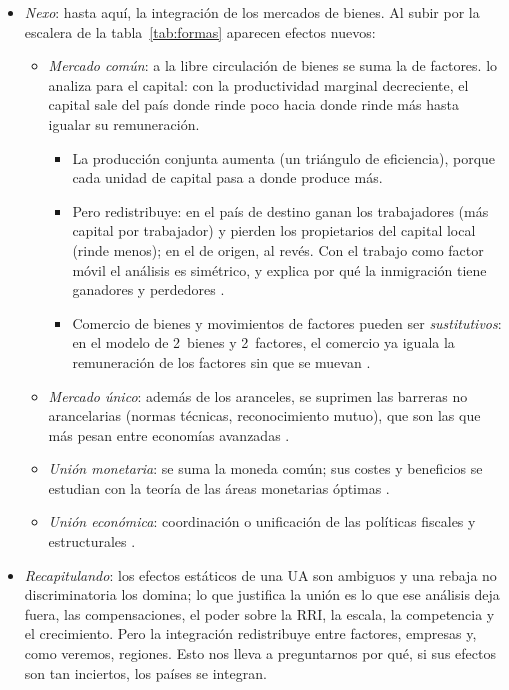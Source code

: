 \documentclass[11pt]{article}
\begin{document}
\begin{itemize}
\item \emph{Nexo}: hasta aquí, la integración de los mercados de bienes. Al subir por la escalera de la tabla~\ref{tab:formas} aparecen efectos nuevos:
  \begin{itemize}
  \item \emph{Mercado común}: a la libre circulación de bienes se suma la de factores. \textcite{MacDougall1960} lo analiza para el capital: con la productividad marginal decreciente, el capital sale del país donde rinde poco hacia donde rinde más hasta igualar su remuneración.
    \begin{itemize}
    \item La producción conjunta aumenta (un triángulo de eficiencia), porque cada unidad de capital pasa a donde produce más.
    \item Pero redistribuye: en el país de destino ganan los trabajadores (más capital por trabajador) y pierden los propietarios del capital local (rinde menos); en el de origen, al revés. Con el trabajo como factor móvil el análisis es simétrico, y explica por qué la inmigración tiene ganadores y perdedores .
    \item Comercio de bienes y movimientos de factores pueden ser \emph{sustitutivos}: en el modelo de 2~bienes y 2~factores, el comercio ya iguala la remuneración de los factores sin que se muevan\nocite{Mundell1957} .
    \end{itemize}
  \item \emph{Mercado único}: además de los aranceles, se suprimen las barreras no arancelarias (normas técnicas, reconocimiento mutuo), que son las que más pesan entre economías avanzadas .
  \item \emph{Unión monetaria}: se suma la moneda común; sus costes y beneficios se estudian con la teoría de las áreas monetarias óptimas .
  \item \emph{Unión económica}: coordinación o unificación de las políticas fiscales y estructurales .
  \end{itemize}
\item \emph{Recapitulando}: los efectos estáticos de una UA son ambiguos y una rebaja no discriminatoria los domina; lo que justifica la unión es lo que ese análisis deja fuera, las compensaciones, el poder sobre la RRI, la escala, la competencia y el crecimiento. Pero la integración redistribuye entre factores, empresas y, como veremos, regiones. Esto nos lleva a preguntarnos por qué, si sus efectos son tan inciertos, los países se integran.
\end{itemize}
\end{document}
